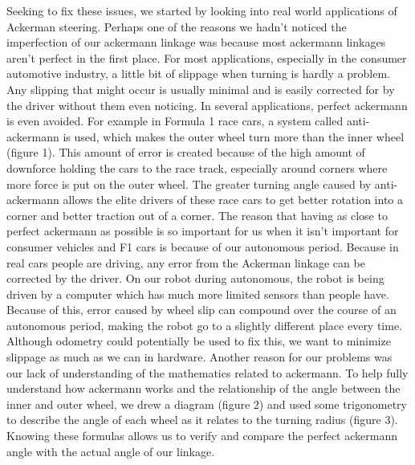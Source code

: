 Seeking to fix these issues, we started by looking into real world applications of Ackerman steering. Perhaps one of the reasons we hadn’t noticed the imperfection of our ackermann linkage was because most ackermann linkages aren’t perfect in the first place. For most applications, especially in the consumer automotive industry, a little bit of slippage when turning is hardly a problem. Any slipping that might occur is usually minimal and is easily corrected for by the driver without them even noticing. In several applications, perfect ackermann is even avoided. For example in Formula 1 race cars, a system called anti-ackermann is used, which makes the outer wheel turn more than the inner wheel (figure 1). This amount of error is created because of the high amount of downforce holding the cars to the race track, especially around corners where more force is put on the outer wheel. The greater turning angle caused by anti-ackermann allows the elite drivers of these race cars to get better rotation into a corner and better traction out of a corner. The reason that having as close to perfect ackermann as possible is so important for us when it isn’t important for consumer vehicles and F1 cars is because of our autonomous period. Because in real cars people are driving, any error from the Ackerman linkage can be corrected by the driver. On our robot during autonomous, the robot is being driven by a computer which has much more limited sensors than people have. Because of this, error caused by wheel slip can compound over the course of an autonomous period, making the robot go to a slightly different place every time. Although odometry could potentially be used to fix this, we want to minimize slippage as much as we can in hardware.
Another reason for our problems was our lack of understanding of the mathematics related to ackermann. To help fully understand how ackermann works and the relationship of the angle between the inner and outer wheel, we drew a diagram (figure 2) and used some trigonometry to describe the angle of each wheel as it relates to the turning radius (figure 3). Knowing these formulas allows us to verify and compare the perfect ackermann angle with the actual angle of our linkage.
